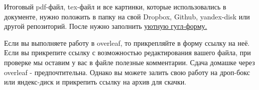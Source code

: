 \documentclass[12pt, a4paper, oneside]{article}
\begin{document}
Итоговый pdf-файл, tex-файл и все картинки, которые использовались в документе, нужно положить в папку на свой Dropbox, Github, yandex-disk или другой репозиторий. После нужно заполнить \href{https://docs.google.com/forms/d/e/1FAIpQLSe11kxKVfv07iCL1E9yNX7ll9swKImiVwRr1H70lslGzInRSg/viewform}{уютную гугл-форму.}  

Если вы выполняете работу в overleaf, то прикрепляйте в форму ссылку на неё. Если вы прикрепите ссылку с возможностью редактирования вашего файла, при проверке мы оставим у вас в файле полезные комментарии. Сдача домашке через overleaf - предпочтительна.  Однако вы можете залить свою работу на дроп-бокс или яндекс-диск и прикрепить ссылку на архив для скачки. 
\end{document}
